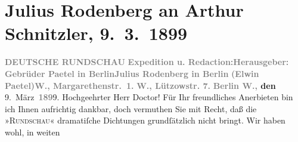 

         
         \renewcommand{\erwaehntePersonen}{Personen: Elwin Paetel, Julius Rodenberg}
         \renewcommand{\erwaehnteInstitutionen}{Institutionen: Deutsche Rundschau, Gebrüder Paetel Verlag}
         \renewcommand{\erwaehnteOrte}{Orte: Berlin, Lützowstraße, Margaretenstraße, Wien}
         \renewcommand{\erwaehnteWerke}{Werke: Die Gefährtin. Schauspiel in einem Akt}
               \section[Julius Rodenberg an Arthur Schnitzler, 9. 3. 1899]{ Julius Rodenberg an Arthur Schnitzler, 9. 3. 1899}\nopagebreak{}\rehead{ }\begin{ledgroupsized}[t]{13cm}\normalsize\beginnumbering \toendnotes[C]{\smallbreak\pagebreak[2]} 
\toendnotes[C]{\smallbreak}\pstart
           \noindent{}\centering{}{\pb}\textcolor{gray}{\textbf{DEUTSCHE RUNDSCHAU}}\pend
           \pstart
           \noindent{}\textcolor{gray}{\textbf{Expedition u. Redaction:}}\hfill \textcolor{gray}{\textbf{Herausgeber:}}\pend
           \pstart
           \textcolor{gray}{\textbf{Gebrüder Paetel in Berlin}}\hfill \textcolor{gray}{\textbf{Julius Rodenberg in Berlin}}\pend
           \pstart
           \textcolor{gray}{\textbf{(Elwin Paetel)}}\hfill \textcolor{gray}{\textbf{W., Margarethenstr. 1.}}\pend
           \pstart
           \textcolor{gray}{\textbf{W., Lützowstr. 7.}}\pend
           \pstart
           \raggedleft{}\textbf{\textcolor{gray}{\textbf{Berlin W.,}} den}{ }9. März \textcolor{gray}{\textbf{189}}9.\pend
           \pstart{}Hochgeehrter Herr Doctor!\pend\pstart
           Für Ihr freundliches Anerbieten bin ich Ihnen aufrichtig dankbar, doch vermuthen Sie
               mit Recht, daß die »\textsc{Rundschau}« dramatiſche Dichtungen grundſätzlich nicht bringt. Wir haben wohl, in weiten

\end{ledgroupsized}
